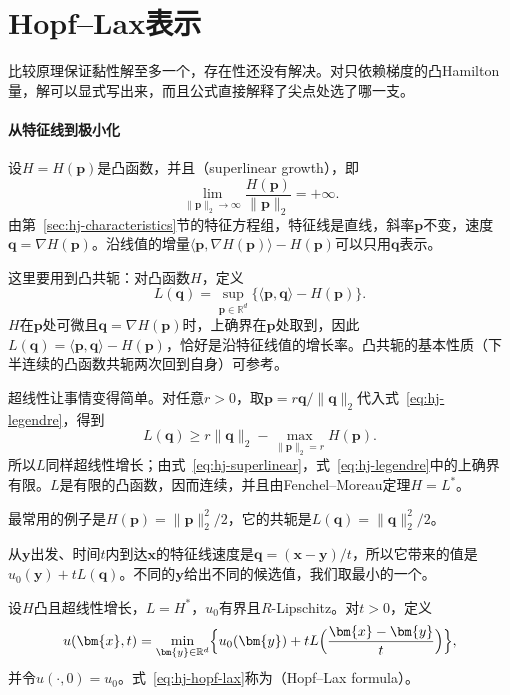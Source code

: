 \section{Hopf--Lax表示}
\label{sec:hj-hopf-lax}

比较原理保证黏性解至多一个，存在性还没有解决。对只依赖梯度的凸Hamilton量，解可以显式写出来，而且公式直接解释了尖点处选了哪一支。

\paragraph{从特征线到极小化}
设$H=H(\bm{p})$是凸函数，并且（superlinear growth），即
\begin{equation}
  \lim_{\lVert\bm{p}\rVert_2\to\infty}\frac{H(\bm{p})}{\lVert\bm{p}\rVert_2}=+\infty.
  \label{eq:hj-superlinear}
\end{equation}
由第~\ref{sec:hj-characteristics}节的特征方程组，特征线是直线，斜率$\bm{p}$不变，速度$\bm{q}=\nabla H(\bm{p})$。沿线值的增量$\langle\bm{p},\nabla H(\bm{p})\rangle-H(\bm{p})$可以只用$\bm{q}$表示。

这里要用到凸共轭：对凸函数$H$，定义
\begin{equation}
  L(\bm{q})=\sup_{\bm{p}\in\mathbb{R}^{d}}\bigl\{\langle\bm{p},\bm{q}\rangle-H(\bm{p})\bigr\}.
  \label{eq:hj-legendre}
\end{equation}
$H$在$\bm{p}$处可微且$\bm{q}=\nabla H(\bm{p})$时，上确界在$\bm{p}$处取到，因此$L(\bm{q})=\langle\bm{p},\bm{q}\rangle-H(\bm{p})$，恰好是沿特征线值的增长率。凸共轭的基本性质（下半连续的凸函数共轭两次回到自身）可参考。

超线性让事情变得简单。对任意$r>0$，取$\bm{p}=r\bm{q}/\lVert\bm{q}\rVert_2$代入式~\eqref{eq:hj-legendre}，得到
\[
  L(\bm{q})\geq r\lVert\bm{q}\rVert_2-\max_{\lVert\bm{p}\rVert_2=r}H(\bm{p}).
\]
所以$L$同样超线性增长；由式~\eqref{eq:hj-superlinear}，式~\eqref{eq:hj-legendre}中的上确界有限。$L$是有限的凸函数，因而连续，并且由Fenchel--Moreau定理$H=L^*$。

最常用的例子是$H(\bm{p})=\lVert\bm{p}\rVert_2^2/2$，它的共轭是$L(\bm{q})=\lVert\bm{q}\rVert_2^2/2$。

从$\bm{y}$出发、时间$t$内到达$\bm{x}$的特征线速度是$\bm{q}=(\bm{x}-\bm{y})/t$，所以它带来的值是$u_0(\bm{y})+tL(\bm{q})$。不同的$\bm{y}$给出不同的候选值，我们取最小的一个。

\begin{definition}
\label{def:hj-hopf-lax}
设$H$凸且超线性增长，$L=H^*$，$u_0$有界且$R$-Lipschitz。对$t>0$，定义
\begin{equation}
  u(\bm{x},t)=\min_{\bm{y}\in\mathbb{R}^{d}}\Bigl\{u_0(\bm{y})+tL\Bigl(\frac{\bm{x}-\bm{y}}{t}\Bigr)\Bigr\},
  \label{eq:hj-hopf-lax}
\end{equation}
并令$u(\cdot,0)=u_0$。式~\eqref{eq:hj-hopf-lax}称为（Hopf--Lax formula）。
\end{definition}

